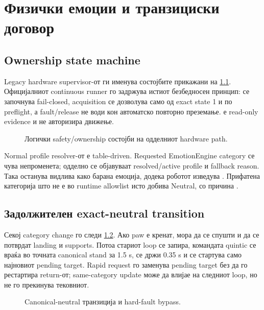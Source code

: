 \chapter{Физички емоции и транзициски договор}
\label{chap:physical-emotions}

\section{Ownership state machine}

Legacy hardware supervisor-от ги именува состојбите прикажани на
\cref{fig:hardware-sm}. Официјалниот continuous runner го задржува истиот
безбедносен принцип: се започнува fail-closed, acquisition се дозволува само
од exact state 1 и по preflight, а fault/release не води кон автоматско
повторно преземање.  е read-only evidence и не
авторизира движење.

\begin{figure}[htbp]
\centering
\resizebox{0.92\textwidth}{!}{}
\caption{Логички safety/ownership состојби на одделниот hardware path.}
\label{fig:hardware-sm}
\end{figure}

Normal profile resolver-от е table-driven. Requested EmotionEngine category
се чува непроменета; одделно се објавуваат resolved/active profile и
fallback reason. Така  останува видлива како барана емоција,
додека роботот изведува . Прифатена категорија
што не е во runtime allowlist исто добива Neutral, со причина
.

\section{Задолжителен exact-neutral transition}

Секој category change го следи \cref{fig:canonical-transition}. Ако paw е
кренат, мора да се спушти и да се потврдат landing и supports. Потоа стариот
loop се запира, командата quintic се враќа во точната canonical stand за 1.5 s,
се држи 0.35 s и се стартува само најновиот pending target. Rapid request го
заменува pending target без да го рестартира return-от; same-category update
може да влијае на следниот loop, но не го прекинува тековниот.

\begin{figure}[htbp]
\centering
\resizebox{\textwidth}{!}{}
\caption{Canonical-neutral транзиција и hard-fault bypass.}
\label{fig:canonical-transition}
\end{figure}

